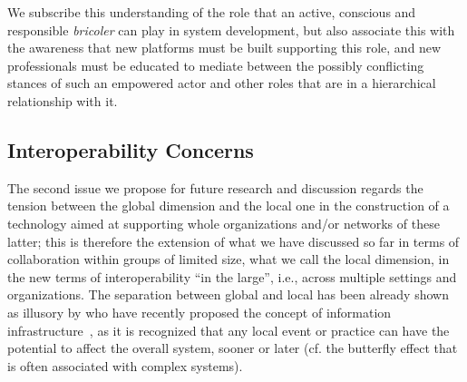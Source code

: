 \documentclass{article}
\begin{document}
We subscribe this understanding of the role that an active, conscious and responsible \emph{bricoler} can play in system development, but also associate this with the awareness that new platforms must be built supporting this role, and new professionals must be educated to mediate between the possibly conflicting stances of such an empowered actor and other roles that are in a hierarchical relationship with it.


\subsection{Interoperability Concerns}
\label{subsec:inter}
 









The second issue we propose for future research and discussion regards the tension between the global dimension and the local one in the construction of a technology aimed at supporting whole organizations and/or networks of these latter; this is therefore the extension of what we have discussed so far in terms of collaboration within groups of limited size, what we call the local dimension, in the new terms of interoperability ``in the large'', i.e., across multiple settings and organizations. The separation between global and local has been already shown as illusory by who have recently proposed the concept of information infrastructure~\citep[e.g., ][]{ellingsen_integration_2012}, as it is recognized that any local event or practice can have the potential to affect the overall system, sooner or later (cf. the butterfly effect that is often associated with complex systems). 
\end{document}
